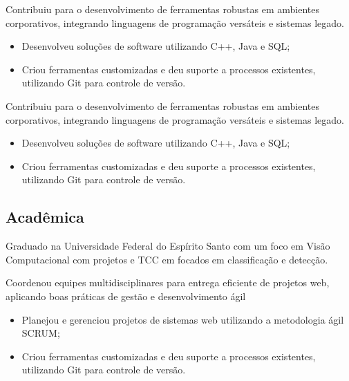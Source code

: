 \documentclass[10pt, a4paper, roman]{moderncv} %
\begin{document}
\vspace{0.4cm}
{
    Contribuiu para o desenvolvimento de ferramentas robustas em ambientes corporativos, integrando linguagens de programação versáteis e sistemas legado.\\
    \begin{itemize}
      \item Desenvolveu soluções de software utilizando C++, Java e SQL;
      \item Criou ferramentas customizadas e deu suporte a processos existentes, utilizando Git para controle de versão.
    \end{itemize}
}



\vspace{0.4cm}
{
    Contribuiu para o desenvolvimento de ferramentas robustas em ambientes corporativos, integrando linguagens de programação versáteis e sistemas legado.\\
    \begin{itemize}
      \item Desenvolveu soluções de software utilizando C++, Java e SQL;
      \item Criou ferramentas customizadas e deu suporte a processos existentes, utilizando Git para controle de versão.
    \end{itemize}
}

\vspace{0.6cm}
\subsection{Acadêmica}

\vspace{0.2cm}
{
  Graduado na Universidade Federal do Espírito Santo com um foco em Visão Computacional com  projetos e TCC em focados em classificação e detecção.
}

\vspace{0.2cm}

\vspace{0.4cm}

{
    Coordenou equipes multidisciplinares para entrega eficiente de projetos web, aplicando boas práticas de gestão e desenvolvimento ágil\\
    \begin{itemize}
      \item Planejou e gerenciou projetos de sistemas web utilizando a metodologia ágil SCRUM;
      \item Criou ferramentas customizadas e deu suporte a processos existentes, utilizando Git para controle de versão.
    \end{itemize}
}
\end{document}
